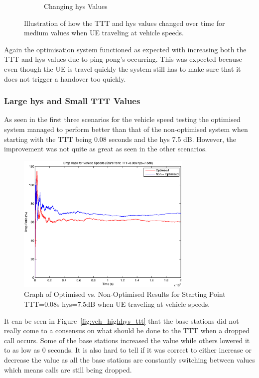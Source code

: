 \begin{figure}[H]
\begin{subfigure}[b]{0.49\textwidth}
                \caption{Changing hys Values}
                \label{fig:veh_low_hys}
        \end{subfigure}
        \caption{Illustration of how the TTT and hys values changed over time for medium values when UE traveling at vehicle speeds.}\label{fig:vel_low_ttthys}
\end{figure}
Again the optimisation system functioned as expected with increasing both the TTT and hys values due to ping-pong’s occurring. This was expected because even though the UE is travel quickly the system still has to make sure that it does not trigger a handover too quickly.
\subsubsection*{Large hys and Small TTT Values}
As seen in the first three scenarios for the vehicle speed testing the optimised system managed to perform better than that of the non-optimised system when starting with the TTT being 0.08 seconds and the hys 7.5 dB. However, the improvement was not quite as great as seen in the other scenarios. 
\begin{figure}[H]
  \begin{center}
    	  \includegraphics[width=0.75\textwidth]{figures/vehicle_figures/highhys/long_drop.eps}
    \end{center}
    \caption{Graph of Optimised vs. Non-Optimised Results for Starting Point TTT=0.08s hys=7.5dB when UE traveling at vehicle speeds.}
    \label{fig:veh_highhys_drop}
\end{figure}
It can be seen in Figure~\ref{fig:veh_highhys_ttt} that the base stations did not really come to a consensus on what should be done to the TTT when a dropped call occurs. Some of the base stations increased the value while others lowered it to as low as 0 seconds. It is also hard to tell if it was correct to either increase or decrease the value as all the base stations are constantly switching between values which means calls are still being dropped.

